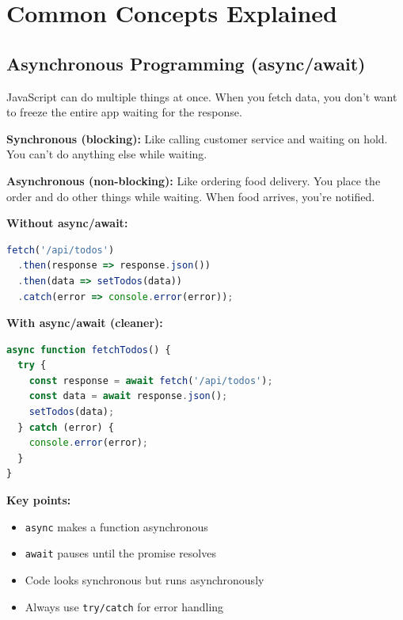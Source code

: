\documentclass[12pt,a4paper]{article}
\begin{document}
\section{Common Concepts Explained}

\subsection{Asynchronous Programming (async/await)}

JavaScript can do multiple things at once. When you fetch data, you don't want to freeze the entire app waiting for the response.

\begin{tcolorbox}[colback=blue!5!white,colframe=blue!75!black,title=Analogy]
\textbf{Synchronous (blocking):} Like calling customer service and waiting on hold. You can't do anything else while waiting.

\textbf{Asynchronous (non-blocking):} Like ordering food delivery. You place the order and do other things while waiting. When food arrives, you're notified.
\end{tcolorbox}

\textbf{Without async/await:}
\begin{lstlisting}[language=JavaScript]
fetch('/api/todos')
  .then(response => response.json())
  .then(data => setTodos(data))
  .catch(error => console.error(error));
\end{lstlisting}

\textbf{With async/await (cleaner):}
\begin{lstlisting}[language=JavaScript]
async function fetchTodos() {
  try {
    const response = await fetch('/api/todos');
    const data = await response.json();
    setTodos(data);
  } catch (error) {
    console.error(error);
  }
}
\end{lstlisting}

\textbf{Key points:}
\begin{itemize}
    \item \texttt{async} makes a function asynchronous
    \item \texttt{await} pauses until the promise resolves
    \item Code looks synchronous but runs asynchronously
    \item Always use \texttt{try/catch} for error handling
\end{itemize}
\end{document}
